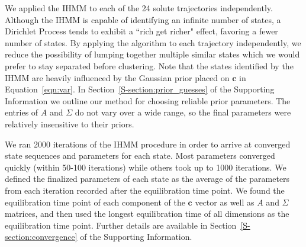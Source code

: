 \documentclass{article}
\begin{document}
  
  We applied the IHMM to each of the 24 solute trajectories independently.
  Although the IHMM is capable of identifying an infinite number of states, 
  a Dirichlet Process tends to exhibit a ``rich get richer" effect, favoring
  a fewer number of states. By applying the algorithm to each trajectory 
  independently, we reduce the possibility of lumping together multiple 
  similar states which we would prefer to stay separated before clustering.
  Note that the states identified by the IHMM are heavily influenced by 
  the Gaussian prior placed on $\mathbf{c}$ in Equation~\ref{eqn:var}. 
  In Section~\ref{S-section:prior_guesses} of the Supporting Information we outline our method for 
  choosing reliable prior parameters. The entries of $A$ and $\Sigma$ do 
  not vary over a wide range, so the final parameters were relatively insensitive
  to their priors.
  

  We ran 2000 iterations of the IHMM procedure in order to arrive at converged 
  state sequences and parameters for each state. Most parameters converged 
  quickly (within 50-100 iterations) while others took up to 1000 iterations.
  We defined the finalized parameters of each state as the average of the 
  parameters from each iteration recorded after the equilibration time point.
  We found the equilibration time point of each component of the $\mathbf{c}$ 
  vector as well as $A$ and $\Sigma$ matrices, and then used the longest 
  equilibration time of all dimensions as the equilibration time point.
  Further details are available in Section~\ref{S-section:convergence} of
  the Supporting Information.
  
\end{document}

